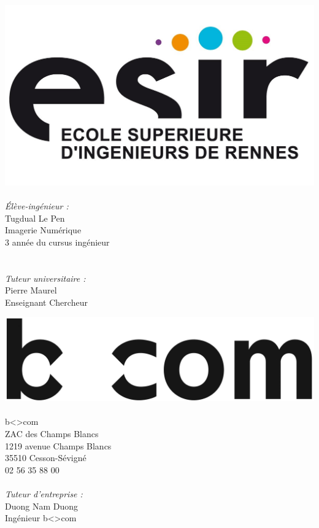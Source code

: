 \begin{titlepage}
  \begin{center}

    \begin{minipage}{0.45\textwidth}
      \begin{flushleft} \large
        \includegraphics[width=0.9\columnwidth]{datas/logo_esir.jpg}~\\
        \emph{Élève-ingénieur :}\\
        Tugdual Le Pen\\
        Imagerie Numérique\\
        3 année du cursus ingénieur\\
        ~\\~\\
        \emph{Tuteur universitaire :}\\
        Pierre Maurel\\
        Enseignant Chercheur
      \end{flushleft}
    \end{minipage}
    \begin{minipage}{0.45\textwidth}
      \begin{flushright} \large
        \vspace{34pt}
        \includegraphics[width=0.9\columnwidth]{datas/logo_bcom.jpg}~\\
        \vspace{29pt}
        b<>com\\
        ZAC des Champs Blancs\\
        1219 avenue Champs Blancs\\
        35510 Cesson-Sévigné\\
        02 56 35 88 00\\
        ~\\
        \emph{Tuteur d'entreprise :}\\
        Duong Nam Duong\\
        Ingénieur b<>com\\
      \end{flushright}
    \end{minipage}


\end{center}
\end{titlepage}
